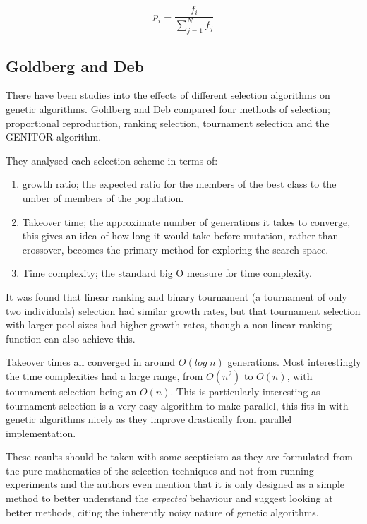 \documentclass[10pt, a4paper]{article}
\begin{document}
\begin{equation}
p_i = \frac{f_i}{\sum^N_{j=1}f_j}
\label{eq:roulette}
\end{equation}

\subsection{Goldberg and Deb}
There have been studies into the effects of different selection algorithms on 
genetic algorithms. Goldberg and Deb\cite{Goldberg1991Comparative} compared
four methods of selection; proportional reproduction, ranking selection,
tournament selection and the GENITOR algorithm.%

They analysed each selection scheme in terms of:

\begin{enumerate}
\item growth ratio; the expected ratio for the members of the best class to the
umber of members of the population.
\item Takeover time; the approximate number of generations it takes
to converge, this gives an idea of how long it would take before mutation,
rather than crossover, becomes the primary method for exploring the search
space. 
\item Time complexity; the standard big O measure for time complexity.
\end{enumerate}

It was found that linear ranking and binary tournament (a tournament of only
two individuals) selection had similar growth rates, but that tournament 
selection with larger pool sizes had higher growth rates, though a non-linear
ranking function can also achieve this.

Takeover times all converged in around $O(log\;n)$ generations. Most 
interestingly the time complexities had a large range, from $O(n^2)$ to $O(n)$,
with tournament selection being an $O(n)$. This is particularly interesting as
tournament selection is a very easy algorithm to make parallel, this fits in
with genetic algorithms nicely as they improve drastically from parallel 
implementation.

These results should be taken with some scepticism as they are formulated from
the pure mathematics of the selection techniques and not from running 
experiments and the authors even mention that it is only designed as a simple 
method to better understand the \textit{expected} behaviour and suggest looking
at better methods, citing the inherently noisy nature of genetic algorithms.
\end{document}
